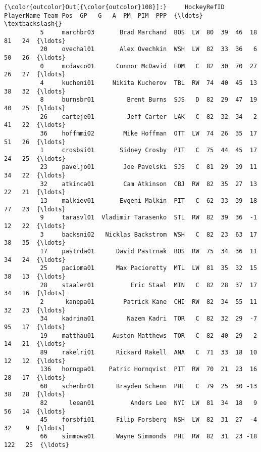 \documentclass[11pt]{article}
\begin{document}
\begin{Verbatim}[commandchars=\\\{\}]
{\color{outcolor}Out[{\color{outcolor}108}]:}     HockeyRefID          PlayerName Team Pos  GP   G   A  PM  PIM  PPP  {\ldots}    \textbackslash{}
          5     marchbr03       Brad Marchand  BOS  LW  80  39  46  18   81   24  {\ldots}     
          20    ovechal01       Alex Ovechkin  WSH  LW  82  33  36   6   50   26  {\ldots}     
          0     mcdavco01      Connor McDavid  EDM   C  82  30  70  27   26   27  {\ldots}     
          4     kucheni01     Nikita Kucherov  TBL  RW  74  40  45  13   38   32  {\ldots}     
          8     burnsbr01         Brent Burns  SJS   D  82  29  47  19   40   25  {\ldots}     
          26    carteje01         Jeff Carter  LAK   C  82  32  34   2   41   22  {\ldots}     
          36    hoffmmi02        Mike Hoffman  OTT  LW  74  26  35  17   51   26  {\ldots}     
          1     crosbsi01       Sidney Crosby  PIT   C  75  44  45  17   24   25  {\ldots}     
          23    paveljo01        Joe Pavelski  SJS   C  81  29  39  11   34   22  {\ldots}     
          32    atkinca01        Cam Atkinson  CBJ  RW  82  35  27  13   22   21  {\ldots}     
          13    malkiev01       Evgeni Malkin  PIT   C  62  33  39  18   77   23  {\ldots}     
          9     tarasvl01  Vladimir Tarasenko  STL  RW  82  39  36  -1   12   22  {\ldots}     
          3     backsni02   Nicklas Backstrom  WSH   C  82  23  63  17   38   35  {\ldots}     
          17    pastrda01      David Pastrnak  BOS  RW  75  34  36  11   34   24  {\ldots}     
          25    pacioma01      Max Pacioretty  MTL  LW  81  35  32  15   38   13  {\ldots}     
          28    staaler01          Eric Staal  MIN   C  82  28  37  17   34   16  {\ldots}     
          2      kanepa01        Patrick Kane  CHI  RW  82  34  55  11   32   23  {\ldots}     
          34    kadrina01         Nazem Kadri  TOR   C  82  32  29  -7   95   17  {\ldots}     
          19    matthau01     Auston Matthews  TOR   C  82  40  29   2   14   21  {\ldots}     
          89    rakelri01      Rickard Rakell  ANA   C  71  33  18  10   12   12  {\ldots}     
          136   hornqpa01    Patric Hornqvist  PIT  RW  70  21  23  16   28   17  {\ldots}     
          60    schenbr01      Brayden Schenn  PHI   C  79  25  30 -13   38   28  {\ldots}     
          82      leean01          Anders Lee  NYI  LW  81  34  18   9   56   14  {\ldots}     
          45    forsbfi01      Filip Forsberg  NSH  LW  82  31  27  -4   32    9  {\ldots}     
          66    simmowa01      Wayne Simmonds  PHI  RW  82  31  23 -18  122   25  {\ldots}     

\end{Verbatim}
\end{document}
